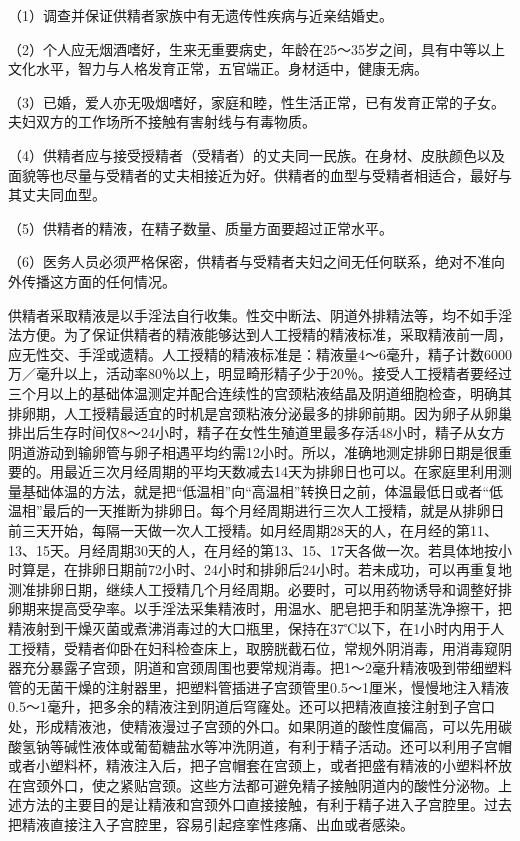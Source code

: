 \documentclass[12pt,UTF8,openany]{ctexbook}
\begin{document}
（1）调查并保证供精者家族中有无遗传性疾病与近亲结婚史。

（2）个人应无烟酒嗜好，生来无重要病史，年龄在25～35岁之间，具有中等以上文化水平，智力与人格发育正常，五官端正。身材适中，健康无病。

（3）已婚，爱人亦无吸烟嗜好，家庭和睦，性生活正常，已有发育正常的子女。夫妇双方的工作场所不接触有害射线与有毒物质。

（4）供精者应与接受授精者（受精者）的丈夫同一民族。在身材、皮肤颜色以及面貌等也尽量与受精者的丈夫相接近为好。供精者的血型与受精者相适合，最好与其丈夫同血型。

（5）供精者的精液，在精子数量、质量方面要超过正常水平。

（6）医务人员必须严格保密，供精者与受精者夫妇之间无任何联系，绝对不准向外传播这方面的任何情况。

供精者采取精液是以手淫法自行收集。性交中断法、阴道外排精法等，均不如手淫法方便。为了保证供精者的精液能够达到人工授精的精液标准，采取精液前一周，应无性交、手淫或遗精。人工授精的精液标准是：精液量4～6毫升，精子计数6000万／毫升以上，活动率80％以上，明显畸形精子少于20％。接受人工授精者要经过三个月以上的基础体温测定并配合连续性的宫颈粘液结晶及阴道细胞检查，明确其排卵期，人工授精最适宜的时机是宫颈粘液分泌最多的排卵前期。因为卵子从卵巢排出后生存时间仅8～24小时，精子在女性生殖道里最多存活48小时，精子从女方阴道游动到输卵管与卵子相遇平均约需12小时。所以，准确地测定排卵日期是很重要的。用最近三次月经周期的平均天数减去14天为排卵日也可以。在家庭里利用测量基础体温的方法，就是把“低温相”向“高温相”转换日之前，体温最低日或者“低温相”最后的一天推断为排卵日。每个月经周期进行三次人工授精，就是从排卵日前三天开始，每隔一天做一次人工授精。如月经周期28天的人，在月经的第11、13、15天。月经周期30天的人，在月经的第13、15、17天各做一次。若具体地按小时算是，在排卵日期前72小时、24小时和排卵后24小时。若未成功，可以再重复地测准排卵日期，继续人工授精几个月经周期。必要时，可以用药物诱导和调整好排卵期来提高受孕率。以手淫法采集精液时，用温水、肥皂把手和阴茎洗净擦干，把精液射到干燥灭菌或煮沸消毒过的大口瓶里，保持在37℃以下，在1小时内用于人工授精，受精者仰卧在妇科检查床上，取膀胱截石位，常规外阴消毒，用消毒窥阴器充分暴露子宫颈，阴道和宫颈周围也要常规消毒。把1～2毫升精液吸到带细塑料管的无菌干燥的注射器里，把塑料管插进子宫颈管里0.5～1厘米，慢慢地注入精液0.5～1毫升，把多余的精液注到阴道后穹窿处。还可以把精液直接注射到子宫口处，形成精液池，使精液漫过子宫颈的外口。如果阴道的酸性度偏高，可以先用碳酸氢钠等碱性液体或葡萄糖盐水等冲洗阴道，有利于精子活动。还可以利用子宫帽或者小塑料杯，精液注入后，把子宫帽套在宫颈上，或者把盛有精液的小塑料杯放在宫颈外口，使之紧贴宫颈。这些方法都可避免精子接触阴道内的酸性分泌物。上述方法的主要目的是让精液和宫颈外口直接接触，有利于精子进入子宫腔里。过去把精液直接注入子宫腔里，容易引起痉挛性疼痛、出血或者感染。
\end{document}

